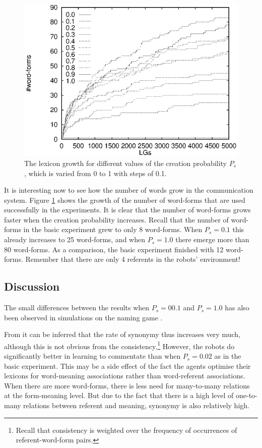 \begin{figure}[t]
\centerline{\includegraphics[width=12cm]{lexicon/words.eps}}
\caption{The lexicon growth for different values of the creation probability $P_s$, which is varied from 0 to 1 with steps of 0.1.}
\label{f:lex:words}
\end{figure}

It is interesting now to see how the number of words grow in the communication system. Figure \ref{f:lex:words} shows the growth of the number of word-forms that are used successfully in the experiments. It is clear that the number of word-forms grows faster when the creation probability increases. Recall that the number of word-forms in the basic experiment grew to only 8 word-forms. When $P_s=0.1$ this already increases to 25 word-forms, and when $P_s=1.0$ there emerge more than 80 word-forms. As a comparison, the basic experiment finished with 12 word-forms. Remember that there are only 4 referents in the robots' environment!

\subsection{Discussion}

The small differences between the results when $P_s=00.1$ and $P_s=1.0$ has also been observed in simulations on the naming game \citep{kaplan:2000}.

From  it can be inferred that the rate of synonymy thus increases very much, although this is not obvious from the consistency.\footnote{Recall that consistency is weighted over the frequency of occurrences of referent-word-form pairs.} However, the robots do significantly better in learning to commentate than when $P_s=0.02$ as in the basic experiment. This may be a side effect of the fact the agents optimise their lexicons for word-meaning associations rather than word-referent associations. When there are more word-forms, there is less need for many-to-many relations at the form-meaning level. But due to the fact that there is a high level of one-to-many relations between referent and meaning, synonymy is also relatively high.


